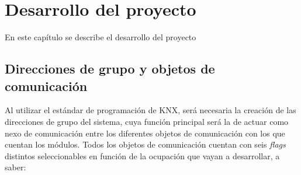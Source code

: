 \chapter{Desarrollo del proyecto}

En este capítulo se describe el desarrollo del proyecto

\section{Direcciones de grupo y objetos de comunicación}
\label{sec:dir_grup}

Al utilizar el estándar de programación de KNX, será necesaria la creación de las direcciones de grupo del sistema, cuya función principal será la de actuar como nexo de comunicación entre los diferentes objetos de comunicación con los que cuentan los módulos. Todos los objetos de comunicación cuentan con seis \textit{flags} distintos seleccionables en función de la ocupación que vayan a desarrollar, a saber:
